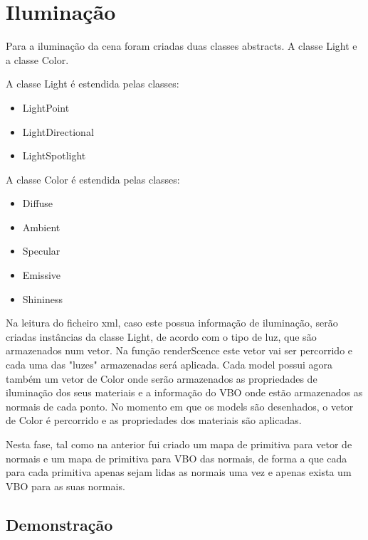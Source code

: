 \documentclass[11pt,a4paper]{report}
\begin{document}
\section{Iluminação}

Para a iluminação da cena foram criadas duas classes abstracts. A classe Light e a classe Color.

A classe Light é estendida pelas classes:

\begin{itemize}
    \item LightPoint
    \item LightDirectional
    \item LightSpotlight 
\end{itemize}
\newline
A classe Color é estendida pelas classes:

\begin{itemize}
    \item Diffuse
    \item Ambient
    \item Specular
    \item Emissive
    \item Shininess
\end{itemize}

Na leitura do ficheiro xml, caso este possua informação de iluminação, serão criadas instâncias da classe Light, de acordo com o tipo de luz, que são armazenados num vetor. Na função renderScence este vetor vai ser percorrido e cada uma das "luzes" armazenadas será aplicada. 
Cada model possui agora também um vetor de Color onde serão armazenados as propriedades de iluminação dos seus materiais e a informação do VBO onde estão armazenados as normais de cada ponto. No momento em que os models são desenhados, o vetor de Color é percorrido e as propriedades dos materiais são aplicadas.
\par
Nesta fase, tal como na anterior fui criado um mapa de primitiva para vetor de normais e um mapa de primitiva para VBO das normais, de forma a que cada para cada primitiva apenas sejam lidas as normais uma vez e apenas exista um VBO para as suas normais. 
\subsection{Demonstração}
\end{document}
